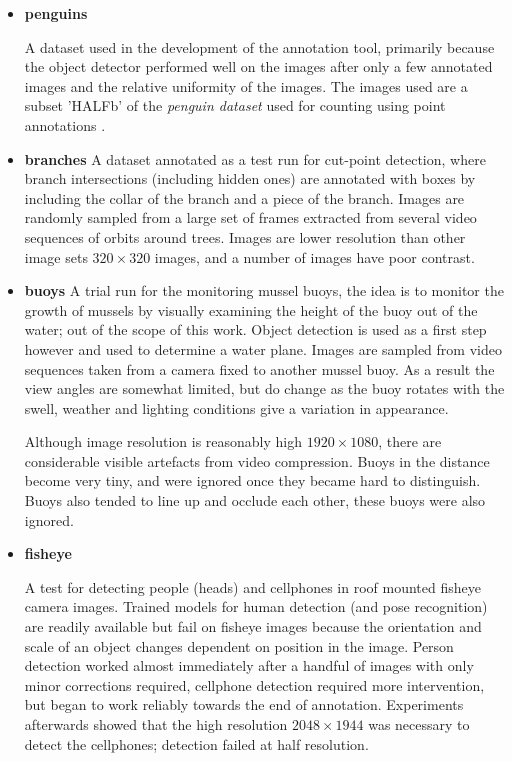 \begin{itemize}
    \item{\bf{penguins}}\par
A dataset used in the development of the annotation tool, primarily because the object detector performed well on the images after only a few annotated images and the relative uniformity of the images. The images used are a subset 'HALFb'  of the \emph{penguin dataset} \cite{PenguinData} used for counting using point annotations \cite{Arteta2016}. 
    \item{\bf{branches}}
A dataset annotated as a test run for cut-point detection, where branch intersections (including hidden ones) are annotated with boxes by including the collar of the branch and a piece of the branch. Images are randomly sampled from a large set of frames extracted from several video sequences of orbits around trees. Images are lower resolution than other image sets $ 320\times320 $ images, and a number of images have poor contrast.

    \item{\bf{buoys}}
A trial run for the monitoring mussel buoys, the idea is to monitor the growth of mussels by visually examining the height of the buoy out of the water; out of the scope of this work. Object detection is used as a first step however and used to determine a water plane. Images are sampled from video sequences taken from a camera fixed to another mussel buoy. As a result the view angles are somewhat limited, but do change as the buoy rotates with the swell, weather and lighting conditions give a variation in appearance. 

Although image resolution is reasonably high $1920\times1080$, there are considerable visible artefacts from video compression. Buoys in the distance become very tiny, and were ignored once they became hard to distinguish. Buoys also tended to line up and occlude each other, these buoys were also ignored.


    \item{\bf{fisheye}}
    
A test for detecting people (heads) and cellphones in roof mounted fisheye camera images. Trained models for human detection (and pose recognition) are readily available but fail on fisheye images because the orientation and scale of an object changes dependent on position in the image. Person detection worked almost immediately after a handful of images with only minor corrections required, cellphone detection required more intervention, but began to work reliably towards the end of annotation. Experiments afterwards showed that the high resolution $2048\times1944$ was necessary to detect the cellphones; detection failed at half resolution.


\end{itemize}
